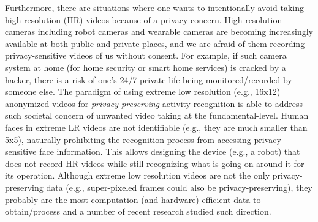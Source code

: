 \documentclass[letterpaper]{article} %
\begin{document}
Furthermore, there are situations where one wants to intentionally avoid taking high-resolution (HR) videos because of a privacy concern. High resolution cameras including robot cameras and wearable cameras are becoming increasingly available at both public and private places, and we are afraid of them recording privacy-sensitive videos of us without consent. For example, if such camera system at home (for home security or smart home services) is cracked by a hacker, there is a risk of one's 24/7 private life being monitored/recorded by someone else. The paradigm of using extreme low resolution (e.g., 16x12) anonymized videos for \emph{privacy-preserving} activity recognition is able to address such societal concern of unwanted video taking at the fundamental-level. Human faces in extreme LR videos are not identifiable (e.g., they are much smaller than 5x5), naturally prohibiting the recognition process from accessing privacy-sensitive face information. This allows designing the device (e.g., a robot) that does not record HR videos while still recognizing what is going on around it for its operation. Although extreme low resolution videos are not the only privacy-preserving data (e.g., super-pixeled frames could also be privacy-preserving), they probably are the most computation (and hardware) efficient data to obtain/process and a number of recent research \cite{dai15,ryoo17privacy} studied such direction.



\end{document}
